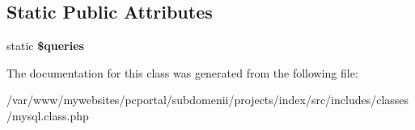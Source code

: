 \subsection*{Static Public Attributes}
\begin{DoxyCompactItemize}
\item 
\hypertarget{classmysql_aad8ebbaccb68d3ff5df9d6ae0fd2058b}{
\-s\-t\-a\-t\-i\-c {\bfseries \$\-q\-u\-e\-r\-i\-e\-s}}
\label{classmysql_aad8ebbaccb68d3ff5df9d6ae0fd2058b}

\end{DoxyCompactItemize}


The documentation for this class was generated from the following file:\begin{DoxyCompactItemize}
\item 
\-/\-v\-a\-r\-/\-w\-w\-w\-/\-m\-y\-w\-e\-b\-s\-i\-t\-e\-s\-/\-p\-c\-p\-o\-r\-t\-a\-l\-/\-s\-u\-b\-d\-o\-m\-e\-n\-i\-i\-/\-p\-r\-o\-j\-e\-c\-t\-s\-/\-i\-n\-d\-e\-x\-/\-s\-r\-c\-/\-i\-n\-c\-l\-u\-d\-e\-s\-/\-c\-l\-a\-s\-s\-e\-s\-/\-m\-y\-s\-q\-l\-.\-c\-l\-a\-s\-s\-.\-p\-h\-p\end{DoxyCompactItemize}
